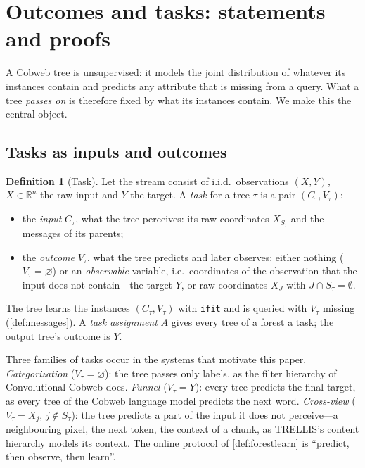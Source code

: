 \documentclass[11pt]{article}
\theoremstyle{definition}
\newtheorem{definition}[theorem]{Definition}
\theoremstyle{remark}
\newcommand{\R}{\mathbb{R}}
\begin{document}
\section{Outcomes and tasks: statements and proofs}\label{sec:tasks}

A Cobweb tree is unsupervised: it models the joint distribution of whatever its
instances contain and predicts any attribute that is missing from a query.  What a tree
\emph{passes on} is therefore fixed by what its instances contain.  We make this the
central object.

\subsection{Tasks as inputs and outcomes}

\begin{definition}[Task]\label{def:task}
Let the stream consist of i.i.d.\ observations $(X,Y)$, $X\in\R^n$ the raw input and
$Y$ the target.  A \emph{task} for a tree $\tau$ is a pair $(C_\tau,V_\tau)$:
\begin{itemize}[leftmargin=*]
\item the \emph{input} $C_\tau$, what the tree perceives: its raw coordinates
  $X_{S_\tau}$ and the messages of its parents;
\item the \emph{outcome} $V_\tau$, what the tree predicts and later observes: either
  nothing ($V_\tau=\varnothing$) or an \emph{observable} variable, i.e.\ coordinates of
  the observation that the input does not contain---the target $Y$, or raw coordinates
  $X_J$ with $J\cap S_\tau=\emptyset$.
\end{itemize}
The tree learns the instances $(C_\tau,V_\tau)$ with \texttt{ifit} and is queried with
$V_\tau$ missing (\cref{def:messages}).  A \emph{task assignment} $A$ gives every tree
of a forest a task; the output tree's outcome is $Y$.
\end{definition}

Three families of tasks occur in the systems that motivate this paper.
\emph{Categorization} ($V_\tau=\varnothing$): the tree passes only labels, as the filter
hierarchy of Convolutional Cobweb does.  \emph{Funnel} ($V_\tau=Y$): every tree predicts
the final target, as every tree of the Cobweb language model predicts the next word.
\emph{Cross-view} ($V_\tau=X_j$, $j\notin S_\tau$): the tree predicts a part of the input
it does not perceive---a neighbouring pixel, the next token, the context of a chunk, as
TRELLIS's content hierarchy models its context.  The online protocol of \cref{def:forestlearn} is ``predict, then observe, then learn''.
\end{document}
